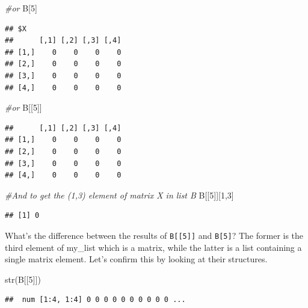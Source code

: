 \documentclass[
]{book}
\newenvironment{Shaded}{\begin{snugshade}}{\end{snugshade}}
\newcommand{\CommentTok}[1]{\textcolor[rgb]{0.56,0.35,0.01}{\textit{#1}}}
\newcommand{\DecValTok}[1]{\textcolor[rgb]{0.00,0.00,0.81}{#1}}
\newcommand{\FunctionTok}[1]{\textcolor[rgb]{0.00,0.00,0.00}{#1}}
\newcommand{\NormalTok}[1]{#1}
\begin{document}
\begin{Shaded}
\begin{Highlighting}[]
\CommentTok{\#or}
\NormalTok{B[}\DecValTok{5}\NormalTok{]}
\end{Highlighting}
\end{Shaded}

\begin{verbatim}
## $X
##      [,1] [,2] [,3] [,4]
## [1,]    0    0    0    0
## [2,]    0    0    0    0
## [3,]    0    0    0    0
## [4,]    0    0    0    0
\end{verbatim}

\begin{Shaded}
\begin{Highlighting}[]
\CommentTok{\#or}
\NormalTok{B[[}\DecValTok{5}\NormalTok{]]}
\end{Highlighting}
\end{Shaded}

\begin{verbatim}
##      [,1] [,2] [,3] [,4]
## [1,]    0    0    0    0
## [2,]    0    0    0    0
## [3,]    0    0    0    0
## [4,]    0    0    0    0
\end{verbatim}

\begin{Shaded}
\begin{Highlighting}[]
\CommentTok{\#And to get the (1,3) element of matrix X in list B}
\NormalTok{B[[}\DecValTok{5}\NormalTok{]][}\DecValTok{1}\NormalTok{,}\DecValTok{3}\NormalTok{]}
\end{Highlighting}
\end{Shaded}

\begin{verbatim}
## [1] 0
\end{verbatim}

What's the difference between the results of \texttt{B{[}{[}5{]}{]}} and \texttt{B{[}5{]}}? The former is the third element of my\_list which is a matrix, while the latter is a list containing a single matrix element. Let's confirm this by looking at their structures.

\begin{Shaded}
\begin{Highlighting}[]
\FunctionTok{str}\NormalTok{(B[[}\DecValTok{5}\NormalTok{]])}
\end{Highlighting}
\end{Shaded}

\begin{verbatim}
##  num [1:4, 1:4] 0 0 0 0 0 0 0 0 0 0 ...
\end{verbatim}
\end{document}
